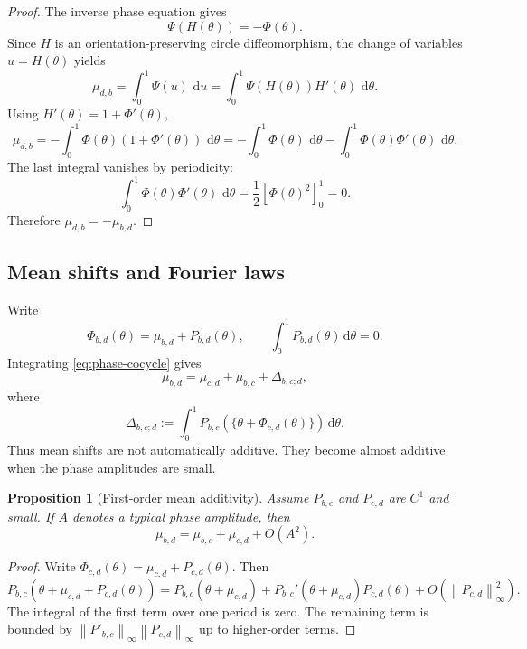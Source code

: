 \documentclass[11pt,a4paper]{article}
\theoremstyle{plain}
\newtheorem{proposition}[theorem]{Proposition}
\theoremstyle{definition}
\theoremstyle{remark}
\newcommand{\dd}{\,\mathrm{d}}
\newcommand{\norm}[1]{\left\lVert #1\right\rVert}
\begin{document}
\begin{proof}
The inverse phase equation gives
\[
  \Psi(H(\theta))=-\Phi(\theta).
\]
Since $H$ is an orientation-preserving circle diffeomorphism, the change of variables $u=H(\theta)$ yields
\[
  \mu_{d,b}
  =\int_0^1\Psi(u)\,\dd u
  =\int_0^1\Psi(H(\theta))H'(\theta)\,\dd\theta.
\]
Using $H'(\theta)=1+\Phi'(\theta)$,
\[
  \mu_{d,b}
  =-\int_0^1\Phi(\theta)(1+\Phi'(\theta))\,\dd\theta
  =-\int_0^1\Phi(\theta)\,\dd\theta
   -\int_0^1\Phi(\theta)\Phi'(\theta)\,\dd\theta.
\]
The last integral vanishes by periodicity:
\[
  \int_0^1\Phi(\theta)\Phi'(\theta)\,\dd\theta
  =\frac12[\Phi(\theta)^2]_0^1=0.
\]
Therefore $\mu_{d,b}=-\mu_{b,d}$.
\end{proof}

\subsection{Mean shifts and Fourier laws}

Write
\[
  \Phi_{b,d}(\theta)=\mu_{b,d}+P_{b,d}(\theta),
  \qquad \int_0^1P_{b,d}(\theta)\dd\theta=0.
\]
Integrating \eqref{eq:phase-cocycle} gives
\begin{equation}\label{eq:mean-cocycle}
  \mu_{b,d}=\mu_{c,d}+\mu_{b,c}+\Delta_{b,c;d},
\end{equation}
where
\begin{equation}\label{eq:delta-mean}
  \Delta_{b,c;d}:=\int_0^1P_{b,c}(\{\theta+\Phi_{c,d}(\theta)\})\dd\theta.
\end{equation}
Thus mean shifts are not automatically additive.  They become almost additive when the phase amplitudes are small.

\begin{proposition}[First-order mean additivity]\label{prop:mean-additivity}
Assume $P_{b,c}$ and $P_{c,d}$ are $C^1$ and small.  If $A$ denotes a typical phase amplitude, then
\begin{equation}\label{eq:first-order-mean-additivity}
  \mu_{b,d}=\mu_{b,c}+\mu_{c,d}+O(A^2).
\end{equation}
\end{proposition}

\begin{proof}
Write $\Phi_{c,d}(\theta)=\mu_{c,d}+P_{c,d}(\theta)$.  Then
\[
  P_{b,c}(\theta+\mu_{c,d}+P_{c,d}(\theta))
  =P_{b,c}(\theta+\mu_{c,d})+P_{b,c}'(\theta+\mu_{c,d})P_{c,d}(\theta)+O(\norm{P_{c,d}}_\infty^2).
\]
The integral of the first term over one period is zero.  The remaining term is bounded by $\norm{P'_{b,c}}_\infty\norm{P_{c,d}}_\infty$ up to higher-order terms.
\end{proof}
\end{document}
